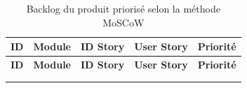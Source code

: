 {\footnotesize
\renewcommand{\arraystretch}{1.2}
\setlength{\tabcolsep}{4pt}
\begin{xltabular}{\textwidth}{|>{\centering\arraybackslash}p{0.8cm}|>{\raggedright\arraybackslash}p{2.7cm}|>{\centering\arraybackslash}p{1.2cm}|>{\raggedright\arraybackslash}X|>{\centering\arraybackslash}p{1.5cm}|}
\caption{Backlog du produit priorisé selon la méthode MoSCoW}
\label{tableau:2-6}\\
\hline
{}
\textbf{ID} & \textbf{Module} & \textbf{ID Story} & \textbf{User Story} & \textbf{Priorité} \\
\hline
\endfirsthead

\hline
{}
\textbf{ID} & \textbf{Module} & \textbf{ID Story} & \textbf{User Story} & \textbf{Priorité} \\
\hline
\endhead

\hline
{} \\
\hline
\endfoot

\hline
\endlastfoot


\end{xltabular}}
